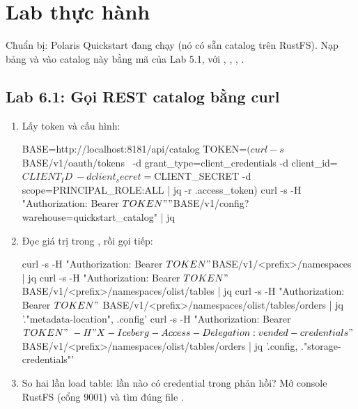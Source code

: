 \section{Lab thực hành}
Chuẩn bị: Polaris Quickstart đang chạy (nó có sẵn catalog  trên RustFS). Nạp bảng  và  vào catalog này bằng mã của Lab 5.1, với , , , .

\subsection{Lab 6.1: Gọi REST catalog bằng curl}
\begin{enumerate}
  \item Lấy token và cấu hình:
\begin{codeblock}
BASE=http://localhost:8181/api/catalog
TOKEN=$(curl -s $BASE/v1/oauth/tokens \
  -d grant_type=client_credentials -d client_id=$CLIENT_ID \
  -d client_secret=$CLIENT_SECRET -d scope=PRINCIPAL_ROLE:ALL | jq -r .access_token)
curl -s -H "Authorization: Bearer $TOKEN" "$BASE/v1/config?warehouse=quickstart_catalog" | jq
\end{codeblock}
  \item Đọc giá trị \code{prefix} trong \code{overrides}, rồi gọi tiếp:
\begin{codeblock}
curl -s -H "Authorization: Bearer $TOKEN" $BASE/v1/<prefix>/namespaces | jq
curl -s -H "Authorization: Bearer $TOKEN" $BASE/v1/<prefix>/namespaces/olist/tables | jq
curl -s -H "Authorization: Bearer $TOKEN" \
  $BASE/v1/<prefix>/namespaces/olist/tables/orders | jq '."metadata-location", .config'
curl -s -H "Authorization: Bearer $TOKEN" \
  -H "X-Iceberg-Access-Delegation: vended-credentials" \
  $BASE/v1/<prefix>/namespaces/olist/tables/orders | jq '.config, ."storage-credentials"'
\end{codeblock}
  \item So hai lần load table: lần nào có credential trong phản hồi? Mở console RustFS (cổng 9001) và tìm đúng file .
\end{enumerate}

